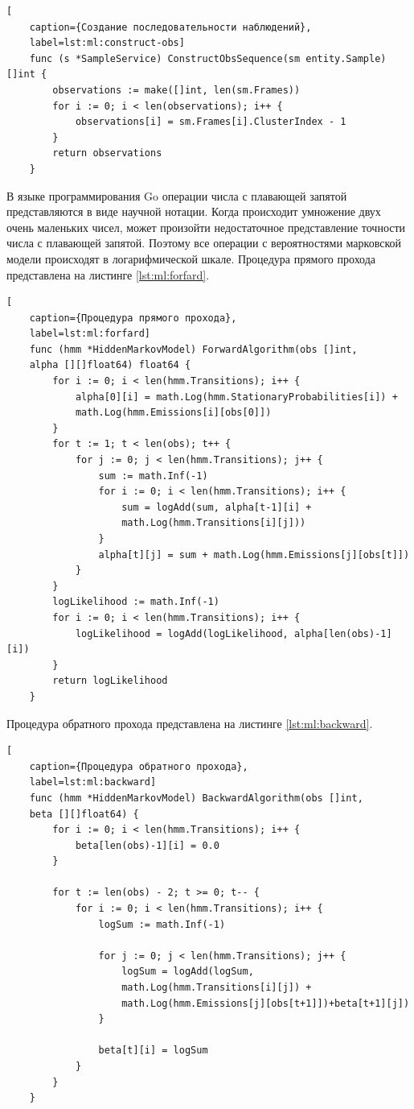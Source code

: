 \begin{lstlisting}[
	caption={Создание последовательности наблюдений},
	label=lst:ml:construct-obs]
	func (s *SampleService) ConstructObsSequence(sm entity.Sample) []int {
		observations := make([]int, len(sm.Frames))
		for i := 0; i < len(observations); i++ {
			observations[i] = sm.Frames[i].ClusterIndex - 1
		}
		return observations
	}
\end{lstlisting}
В языке программирования Go операции числа с плавающей запятой представляются в виде научной нотации. Когда происходит умножение двух очень маленьких чисел, может произойти недостаточное представление точности числа с плавающей запятой. Поэтому все операции с вероятностями марковской модели происходят в логарифмической шкале.
Процедура прямого прохода  представлена на листинге \ref{lst:ml:forfard}.
\begin{lstlisting}[
	caption={Процедура прямого прохода},
	label=lst:ml:forfard]
	func (hmm *HiddenMarkovModel) ForwardAlgorithm(obs []int,
	alpha [][]float64) float64 {
		for i := 0; i < len(hmm.Transitions); i++ {
			alpha[0][i] = math.Log(hmm.StationaryProbabilities[i]) +
			math.Log(hmm.Emissions[i][obs[0]])
		}
		for t := 1; t < len(obs); t++ {
			for j := 0; j < len(hmm.Transitions); j++ {
				sum := math.Inf(-1)
				for i := 0; i < len(hmm.Transitions); i++ {
					sum = logAdd(sum, alpha[t-1][i] + 
					math.Log(hmm.Transitions[i][j]))
				}
				alpha[t][j] = sum + math.Log(hmm.Emissions[j][obs[t]])
			}
		}
		logLikelihood := math.Inf(-1)
		for i := 0; i < len(hmm.Transitions); i++ {
			logLikelihood = logAdd(logLikelihood, alpha[len(obs)-1][i])
		}
		return logLikelihood
	}
\end{lstlisting}
Процедура обратного прохода представлена на листинге \ref{lst:ml:backward}. 
\begin{lstlisting}[
	caption={Процедура обратного прохода},
	label=lst:ml:backward]
	func (hmm *HiddenMarkovModel) BackwardAlgorithm(obs []int, 
	beta [][]float64) {
		for i := 0; i < len(hmm.Transitions); i++ {
			beta[len(obs)-1][i] = 0.0
		}
		
		for t := len(obs) - 2; t >= 0; t-- {
			for i := 0; i < len(hmm.Transitions); i++ {
				logSum := math.Inf(-1)
				
				for j := 0; j < len(hmm.Transitions); j++ {
					logSum = logAdd(logSum,
					math.Log(hmm.Transitions[i][j]) + 
					math.Log(hmm.Emissions[j][obs[t+1]])+beta[t+1][j])
				}
				
				beta[t][i] = logSum
			}
		}
	}
\end{lstlisting}
